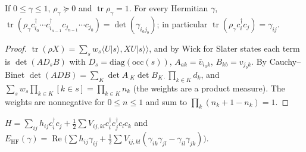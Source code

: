 \begin{theorem}\label{thm:wick-quasi-free}
  \leanok
  If $0\le\gamma\le1$, $\rho_\gamma\succeq0$ and $\operatorname{tr}\rho_\gamma=1$. For every Hermitian $\gamma$,
  $\operatorname{tr}(\rho_\gamma c^\dagger_{i_0}\cdots c^\dagger_{i_{n-1}}c_{j_{n-1}}\cdots c_{j_0})=\det(\gamma_{i_aj_b})$; in particular
  $\operatorname{tr}(\rho_\gamma c_i^\dagger c_j)=\gamma_{ij}$.
\end{theorem}
\begin{proof}\leanok
  $\operatorname{tr}(\rho X)=\sum_sw_s\langle U|s\rangle,XU|s\rangle\rangle$, and by Wick for Slater states each term is
  $\det(AD_sB)$ with $D_s=\mathrm{diag}(\mathrm{occ}(s))$, $A_{ak}=\bar v_{i_ak}$, $B_{kb}=v_{j_bk}$. By Cauchy--Binet
  $\det(ADB)=\sum_K\det A_{\cdot K}\det B_{K\cdot}\prod_{k\in K}d_k$, and $\sum_sw_s\prod_{k\in K}[k\in s]=\prod_{k\in K}n_k$
  (the weights are a product measure). The weights are nonnegative for $0\le n\le1$ and sum to $\prod_k(n_k+1-n_k)=1$.
\end{proof}

\begin{definition}\label{def:hf}
  \leanok
  $H=\sum_{ij}h_{ij}c_i^\dagger c_j+\tfrac12\sum V_{ij,kl}c_i^\dagger c_j^\dagger c_lc_k$ and
  $E_{\mathrm{HF}}(\gamma)=\operatorname{Re}\big(\sum h_{ij}\gamma_{ij}+\tfrac12\sum V_{ij,kl}(\gamma_{ik}\gamma_{jl}-\gamma_{il}\gamma_{jk})\big)$.
\end{definition}

